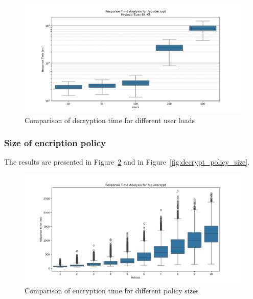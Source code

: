 \documentclass[cic,tc,english]{iiufrgs}
\begin{document}
                \begin{figure}
                    \centering
                    \includegraphics[width=\textwidth]{images/phase3/response_time_api_decrypt_64KB.png}
                    \caption{Comparison of decryption time for different user loads}
                    \label{fig:decrypt_user_load}
                \end{figure}

            \subsubsection{Size of encription policy}
                The results are presented in Figure~\ref{fig:encrypt_policy_size} and in Figure~\ref{fig:decrypt_policy_size}.


                \begin{figure}
                    \centering
                    \includegraphics[width=\textwidth]{images/phase4/response_time_api_encrypt.png}
                    \caption{Comparison of encryption time for different policy sizes}
                    \label{fig:encrypt_policy_size}
                \end{figure}
\end{document}
